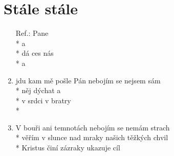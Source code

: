 \section{Stále stále}
\begin{enumerate}
\item[Ref.:]        Pane \\*
  a   \\*
 dá  ces nás  \\*
  a    
\item {}jdu kam mě pošle Pán nebojím se nejsem sám \\*
 něj dýchat  a  \\*
 v srdci   v bratry  \\*
   
\item V bouři ani temnotách nebojím se nemám strach \\*
věřím v slunce nad mraky našich těžkých chvil \\*
Kristus činí zázraky ukazuje cíl 
\end{enumerate}
